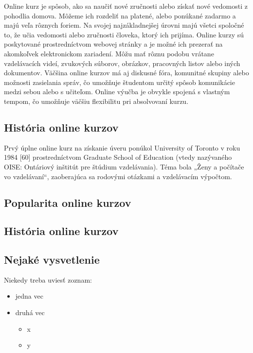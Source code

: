 \documentclass[10pt,twoside,slovak,a4paper]{article}
\begin{document}
Online kurz je spôsob, ako sa naučiť nové zručnosti alebo získať nové vedomosti z pohodlia domova. Môžeme ich rozdeliť na platené, alebo ponúkané zadarmo a majú veľa rôznych foriem. Na svojej najzákladnejšej úrovni majú všetci spoločné to, že učia vedomosti alebo zručnosti človeka, ktorý ich prijíma. Online kurzy sú poskytované prostredníctvom webovej stránky a je možné ich prezerať na akomkoľvek elektronickom zariadení. Môžu mať rôznu podobu vrátane vzdelávacích videí, zvukových súborov, obrázkov, pracovných listov alebo iných dokumentov. Väčšina online kurzov má aj diskusné fóra, komunitné skupiny alebo možnosti zasielania správ, čo umožňuje študentom určitý spôsob komunikácie medzi sebou alebo s učiteľom. Online výučba je obvykle spojená s vlastným tempom, čo umožňuje väčšiu flexibilitu pri absolvovaní kurzu.

\subsection{História online kurzov} \label{historia}

Prvý úplne online kurz na získanie úveru ponúkol University of Toronto v roku 1984 [60] prostredníctvom Graduate School of Education (vtedy nazývaného OISE: Ontáriový inštitút pre štúdium vzdelávania). Téma bola „Ženy a počítače vo vzdelávaní“, zaoberajúca sa rodovými otázkami a vzdelávacím výpočtom.

\subsection{Popularita online kurzov} \label{popularita}

\subsection{História online kurzov} \label{historia}








\subsection{Nejaké vysvetlenie} \label{ina:nejake}

Niekedy treba uviesť zoznam:

\begin{itemize}
\item jedna vec
\item druhá vec
	\begin{itemize}
	\item x
	\item y
	\end{itemize}
\end{itemize}
\end{document}
